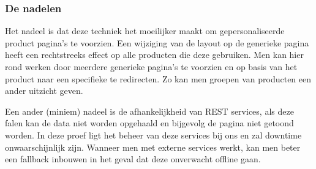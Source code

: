 \documentclass{article}
\begin{document}
	\subsubsection{De nadelen}
    Het nadeel is dat deze techniek het moeilijker maakt om gepersonaliseerde product pagina's te voorzien. Een wijziging van de layout op de generieke pagina heeft een rechtstreeks effect op alle producten die deze gebruiken. Men kan hier rond werken door meerdere generieke pagina's te voorzien en op basis van het product naar een specifieke te redirecten. Zo kan men groepen van producten een ander uitzicht geven.
    \par
    Een ander (miniem) nadeel is de afhankelijkheid van REST services, als deze falen kan de data niet worden opgehaald en bijgevolg de pagina niet getoond worden. In deze proef ligt het beheer van deze services bij ons en zal downtime onwaarschijnlijk zijn. Wanneer men met externe services werkt, kan men beter een fallback inbouwen in het geval dat deze onverwacht offline gaan.
\end{document}
